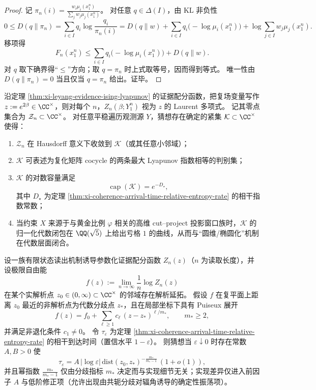 \begin{proof}
记
\(
\pi_n(i)=\frac{w_i\mu_i(x_1^n)}{\sum_j w_j\mu_j(x_1^n)}
\)。
对任意 \(q\in\Delta(I)\)，由 KL 非负性
\[
0\le D(q\|\pi_n)
=\sum_{i\in I}q_i\log\frac{q_i}{\pi_n(i)}
=D(q\|w)+\sum_{i\in I}q_i\bigl(-\log\mu_i(x_1^n)\bigr)+\log\sum_{j\in I}w_j\mu_j(x_1^n).
\]
移项得
\[
F_n(x_1^n)\le \sum_{i\in I}q_i\bigl(-\log\mu_i(x_1^n)\bigr)+D(q\|w).
\]
对 \(q\) 取下确界得“\(\le\)”方向；取 \(q=\pi_n\) 时上式取等号，因而得到等式。
唯一性由 \(D(q\|\pi_n)=0\) 当且仅当 \(q=\pi_n\) 给出。证毕。
\end{proof}

\begin{conjecture}\label{conj:xi-leyang-boundary-capacity-coherence}
沿定理 \ref{thm:xi-leyang-evidence-ising-lyapunov} 的证据配分函数，把复场变量写作 \(z:=e^{2\beta}\in\CC^\times\)，则对每个 \(n\)，\(Z_n(\beta;Y_1^n)\) 视为 \(z\) 的 Laurent 多项式。
记其零点集合为 \(\mathcal Z_n\subset\CC^\times\)。
对任意平稳遍历观测源 \(Y\)，猜想存在确定的紧集 \(\mathcal K\subset\CC^\times\) 使得：
\begin{enumerate}
  \item \(\mathcal Z_n\) 在 Hausdorff 意义下收敛到 \(\mathcal K\)（或其任意小邻域）；
  \item \(\mathcal K\) 可表述为复化矩阵 cocycle 的两条最大 Lyapunov 指数相等的判别集；
  \item \(\mathcal K\) 的对数容量满足
  \[
  \operatorname{cap}(\mathcal K)=e^{-D_\star},
  \]
  其中 \(D_\star\) 为定理 \ref{thm:xi-coherence-arrival-time-relative-entropy-rate} 的相干指数常数；
  \item 当约束 \(X\) 来源于与黄金比例 \(\varphi\) 相关的高维 cut--project 投影窗口族时，\(\mathcal K\) 的归一化代数闭包在 \(\QQ(\sqrt5)\) 上给出亏格 \(1\) 的曲线，从而与“圆维/椭圆化”机制在代数层面闭合。
\end{enumerate}
\end{conjecture}



\begin{conjecture}\label{conj:xi-leyang-puiseux-index-coherence-time}
设一族有限状态读出机制诱导参数化证据配分函数 \(Z_n(z)\)（\(n\) 为读取长度），并设极限自由能
\[
f(z):=\lim_{n\to\infty}\frac1n\log Z_n(z)
\]
在某个实解析点 \(z_0\in(0,\infty)\subset\CC^\times\) 的邻域存在解析延拓。
假设 \(f\) 在复平面上距离 \(z_0\) 最近的非解析点为代数分歧点 \(z_\ast\)，且在局部坐标下具有 Puiseux 展开
\[
f(z)=f_0+\sum_{\ell\ge 1}c_\ell\,(z-z_\ast)^{\ell/m_\ast},
\qquad
m_\ast\ge 2,
\]
并满足非退化条件 \(c_1\neq 0\)。
令 \(\tau_\varepsilon\) 为定理 \ref{thm:xi-coherence-arrival-time-relative-entropy-rate} 的相干到达时间（置信水平 \(1-\varepsilon\)）。
则猜想当 \(\varepsilon\downarrow 0\) 时存在常数 \(A,B>0\) 使
\[
\tau_\varepsilon
=
A\,|\log\varepsilon|\,\mathrm{dist}(z_0,z_\ast)^{-\frac{m_\ast}{m_\ast-1}}\,(1+o(1)),
\]
并且幂指数 \(\frac{m_\ast}{m_\ast-1}\) 仅由分歧指标 \(m_\ast\) 决定而与实现细节无关；实现差异仅进入前因子 \(A\) 与低阶修正项（允许出现由共轭分歧对辐角诱导的确定性振荡项）。
\end{conjecture}
